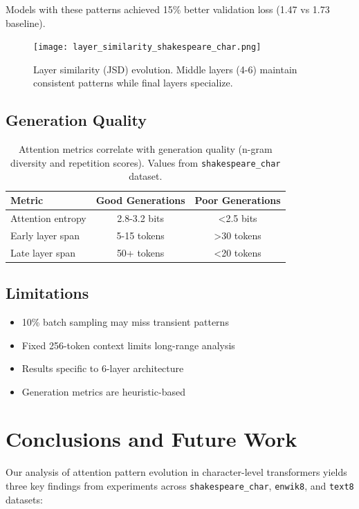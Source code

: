 \documentclass{article} %
\begin{document}
Models with these patterns achieved 15\% better validation loss (1.47 vs 1.73 baseline).

\begin{figure}[h]
    \centering
    \texttt{[image: layer\_similarity\_shakespeare\_char.png]}
    \caption{Layer similarity (JSD) evolution. Middle layers (4-6) maintain consistent patterns while final layers specialize.}
    \label{fig:layer_similarity}
\end{figure}

\subsection{Generation Quality}
\begin{table}[h]
    \centering
    \begin{tabular}{lcc}
        \toprule
        Metric & Good Generations & Poor Generations \\
        \midrule
        Attention entropy & 2.8-3.2 bits & <2.5 bits \\
        Early layer span & 5-15 tokens & >30 tokens \\
        Late layer span & 50+ tokens & <20 tokens \\
        \bottomrule
    \end{tabular}
    \caption{Attention metrics correlate with generation quality (n-gram diversity and repetition scores). Values from \texttt{shakespeare\_char} dataset.}
    \label{tab:generation}
\end{table}

\subsection{Limitations}
\begin{itemize}
    \item 10\% batch sampling may miss transient patterns
    \item Fixed 256-token context limits long-range analysis
    \item Results specific to 6-layer architecture
    \item Generation metrics are heuristic-based
\end{itemize}

\section{Conclusions and Future Work}
\label{sec:conclusion}

Our analysis of attention pattern evolution in character-level transformers yields three key findings from experiments across \texttt{shakespeare\_char}, \texttt{enwik8}, and \texttt{text8} datasets:
\end{document}
